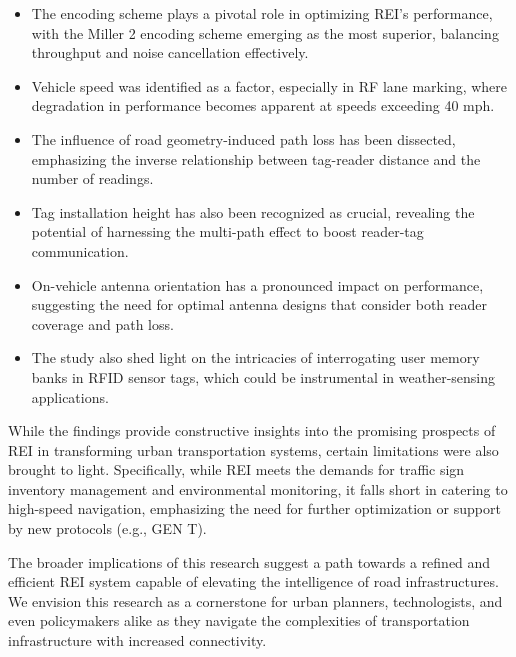 \documentclass[lettersize,journal]{IEEEtran}
\begin{document}
\begin{itemize}
\item The encoding scheme plays a pivotal role in optimizing REI's performance, with the Miller 2 encoding scheme emerging as the most superior, balancing throughput and noise cancellation effectively.
\item Vehicle speed was identified as a factor, especially in RF lane marking, where degradation in performance becomes apparent at speeds exceeding 40 mph.
\item The influence of road geometry-induced path loss has been dissected, emphasizing the inverse relationship between tag-reader distance and the number of readings.
\item Tag installation height has also been recognized as crucial, revealing the potential of harnessing the multi-path effect to boost reader-tag communication.
\item On-vehicle antenna orientation has a pronounced impact on performance, suggesting the need for optimal antenna designs that consider both reader coverage and path loss.
\item The study also shed light on the intricacies of interrogating user memory banks in RFID sensor tags, which could be instrumental in weather-sensing applications.
\end{itemize}

While the findings provide constructive insights into the promising prospects of REI in transforming urban transportation systems, certain limitations were also brought to light. Specifically, while REI meets the demands for traffic sign inventory management and environmental monitoring, it falls short in catering to high-speed navigation, emphasizing the need for further optimization or support by new protocols (e.g., GEN T).

The broader implications of this research suggest a path towards a refined and efficient REI system capable of elevating the intelligence of road infrastructures. We envision this research as a cornerstone for urban planners, technologists, and even policymakers alike as they navigate the complexities of transportation infrastructure with increased connectivity.


%
%
\printbibliography


\newpage

\end{document}
